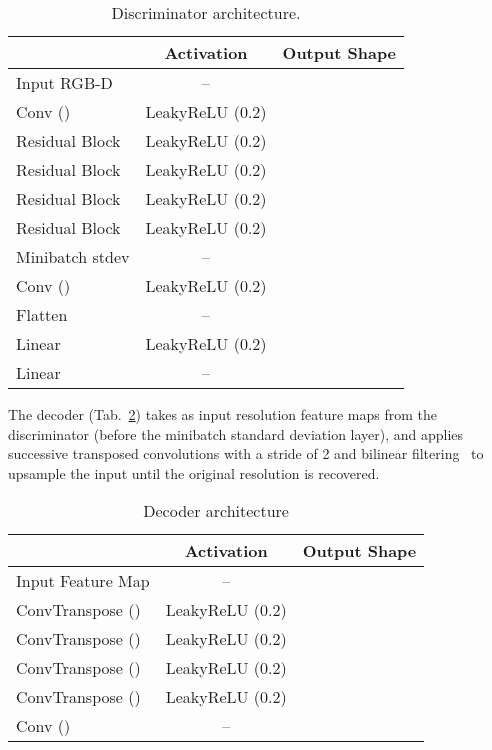 \documentclass[10pt,twocolumn,letterpaper]{article}
\begin{document}
\begin{table}[h]
	\small
	\centering
	\begin{tabular}{lcc}
		\toprule
		& Activation & Output Shape \\
		\midrule
		Input RGB-D & -- &  \\
		Conv () & LeakyReLU (0.2) &  \\
		Residual Block & LeakyReLU (0.2) &  \\
		Residual Block  & LeakyReLU (0.2) &  \\
		Residual Block & LeakyReLU (0.2) &  \\
		Residual Block & LeakyReLU (0.2) &  \\
		Minibatch stdev & -- &  \\
		Conv () & LeakyReLU (0.2) &  \\
		Flatten & --&  \\
		Linear & LeakyReLU (0.2) &  \\
		Linear & -- & \\
		\bottomrule
	\end{tabular}
	\caption{Discriminator architecture.}
	\label{tab:discriminator_architecture}
\end{table}

The decoder (Tab.~\ref{tab:decoder_architecture}) takes as input  resolution feature maps from the discriminator (before the minibatch standard deviation layer), and applies successive transposed convolutions with a stride of 2 and bilinear filtering~\cite{blur} to upsample the input until the original resolution is recovered.

\begin{table}[h]
	\small
	\centering
	\begin{tabular}{lcc}
		\toprule
		& Activation & Output Shape \\
		\midrule
		Input Feature Map & -- &  \\
		ConvTranspose () & LeakyReLU (0.2) &  \\
		ConvTranspose () & LeakyReLU (0.2) &  \\
		ConvTranspose () & LeakyReLU (0.2) &  \\
		ConvTranspose () & LeakyReLU (0.2) &  \\
		Conv () & -- &  \\
		\bottomrule
	\end{tabular}
	\caption{Decoder architecture}
	\label{tab:decoder_architecture}
\end{table}
\end{document}
